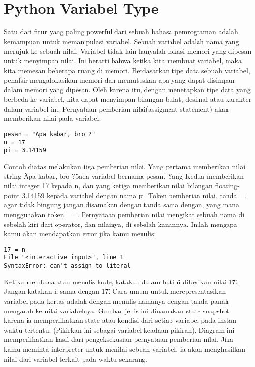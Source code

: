 
\section{Python Variabel Type}
Satu dari fitur yang paling powerful dari sebuah bahasa pemrograman adalah kemampuan untuk memanipulasi variabel. Sebuah variabel adalah nama yang merujuk ke sebuah nilai. Variabel tidak lain hanyalah lokasi memori yang dipesan untuk menyimpan nilai. Ini berarti bahwa ketika kita membuat variabel, maka kita memesan beberapa ruang di memori. Berdasarkan tipe data sebuah variabel, penafsir mengalokasikan memori dan memutuskan apa yang dapat disimpan dalam memori yang dipesan. Oleh karena itu, dengan menetapkan tipe data yang berbeda ke variabel, kita dapat menyimpan bilangan bulat, desimal atau karakter dalam variabel ini.
Pernyataan pemberian nilai(assigment statement) akan memberikan nilai pada variabel: 
\begin{verbatim}
pesan = "Apa kabar, bro ?" 
n = 17  
pi = 3.14159 
\end{verbatim}
Contoh diatas melakukan tiga pemberian nilai. Yang pertama memberikan nilai string \"Apa kabar, bro ?\" pada variabel bernama pesan. Yang Kedua memberikan nilai integer 17 kepada n, dan yang ketiga memberikan nilai bilangan floating-point 3.14159 kepada variabel dengan nama pi.
Token pemberian nilai, tanda =, agar tidak bingung jangan disamakan dengan tanda sama dengan, yang mana menggunakan token ==. Pernyataan pemberian nilai mengikat sebuah nama di sebelah kiri dari operator, dan nilainya, di sebelah kanannya. Inilah mengapa kamu akan mendapatkan error jika kamu menulis: 
\begin{verbatim}
17 = n 
File "<interactive input>", line 1 
SyntaxError: can't assign to literal 
\end{verbatim}
Ketika membaca atau menulis kode, katakan dalam hati \"n diberikan nilai 17\". Jangan katakan \"n sama dengan 17\".
Cara umum untuk merepresentasikan variabel pada kertas adalah dengan menulis namanya dengan tanda panah mengarah ke nilai variabelnya. Gambar jenis ini dinamakan state snapshot karena ia memperlihatkan state atau kondisi dari setiap variabel pada instan waktu tertentu. (Pikirkan ini sebagai variabel keadaan pikiran). Diagram ini memperlihatkan hasil dari pengeksekusian pernyataan pemberian nilai.
Jika kamu meminta interpreter untuk menilai sebuah variabel, ia akan menghasilkan nilai dari variabel terkait pada waktu sekarang.
